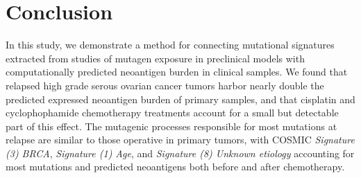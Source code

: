 \documentclass[linenumbers]{bmcart}
\begin{document}

\section*{Conclusion}
In this study, we demonstrate a method for connecting mutational signatures extracted from studies of mutagen exposure in preclinical models with computationally predicted neoantigen burden in clinical samples. We found that relapsed high grade serous ovarian cancer tumors harbor nearly double the predicted expressed neoantigen burden of primary samples, and that cisplatin and cyclophophamide chemotherapy treatments account for a small but detectable part of this effect. The mutagenic processes responsible for most mutations at relapse are similar to those operative in primary tumors, with COSMIC \textit{Signature (3) BRCA}, \textit{Signature (1) Age}, and \textit{Signature (8) Unknown etiology} accounting for most mutations and predicted neoantigens both before and after chemotherapy.


\end{document}
